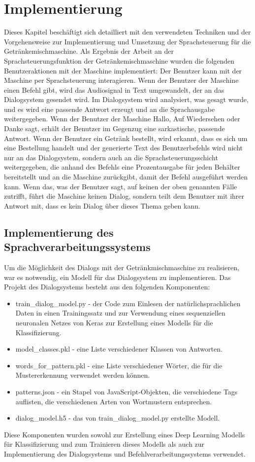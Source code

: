 \chapter{Implementierung}
Dieses Kapitel beschäftigt sich detailliert mit den verwendeten Techniken und der Vorgehensweise zur Implementierung und Umsetzung der Sprachsteuerung für die Getränkemischmaschine.
Als Ergebnis der Arbeit an der Sprachsteuerungsfunktion der Getränkemischmaschine wurden die folgenden Benutzeraktionen mit der Maschine implementiert: 
Der Benutzer kann mit der Maschine per Sprachsteuerung interagieren. 
Wenn der Benutzer der Maschine einen Befehl gibt, wird das Audiosignal in Text umgewandelt, der an das Dialogsystem gesendet wird. 
Im Dialogsystem wird analysiert, was gesagt wurde, und es wird eine passende Antwort erzeugt und an die Sprachausgabe weitergegeben. 
Wenn der Benutzer der Maschine \glqq{}Hallo\grqq{}, \glqq{}Auf Wiedersehen\grqq{} oder \glqq{}Danke\grqq{} sagt, erhält der Benutzer im Gegenzug eine sarkastische, passende Antwort. 
Wenn der Benutzer ein Getränk bestellt, wird erkannt, dass es sich um eine Bestellung handelt und der generierte Text des Benutzerbefehls wird nicht nur an das Dialogsystem, sondern auch an die Sprachsteuerungsschicht weitergegeben, die anhand des Befehls eine Prozentausgabe für jeden Behälter bereitstellt und an die Maschine zurückgibt, damit der Befehl ausgeführt werden kann.
Wenn das, was der Benutzer sagt, auf keinen der oben genannten Fälle zutrifft, führt die Maschine keinen Dialog, sondern teilt dem Benutzer mit ihrer Antwort mit, dass es kein Dialog über dieses Thema geben kann.
\section{Implementierung des Sprachverarbeitungssystems}\label{section:Implementierung_Sprachverarbeitung}
Um die Möglichkeit des Dialogs mit der Getränkmischmaschine zu realisieren, war es notwendig, ein Modell für das Dialogsystem zu implementieren. Das Projekt des Dialogsystems besteht aus den folgenden Komponenten:
\begin{itemize}
    \item train\_dialog\_model.py - der Code zum Einlesen der natürlichsprachlichen Daten in einen Trainingssatz und zur Verwendung eines sequenziellen neuronalen Netzes von Keras zur Erstellung eines Modells für die Klassifizierung.
    \item model\_classes.pkl - eine Liste verschiedener Klassen von Antworten.
    \item words\_for\_pattern.pkl - eine Liste verschiedener Wörter, die für die Mustererkennung verwendet werden können.
    \item patterns.json - ein Stapel von JavaScript-Objekten, die verschiedene Tags auflisten, die verschiedenen Arten von Wortmustern entsprechen.
    \item dialog\_model.h5 - das von train\_dialog\_model.py erstellte Modell.
\end{itemize}
Diese Komponenten wurden sowohl zur Erstellung eines Deep Learning Modells für Klassifizierung und zum Trainieren dieses Modells als auch zur Implementierung des Dialogsystems und Befehlverarbeitungssystems verwendet.
